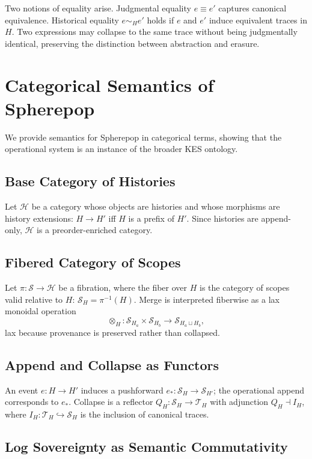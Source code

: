 \documentclass[11pt,a4paper]{article}
\theoremstyle{definition}
\theoremstyle{remark}
\begin{document}
Two notions of equality arise. Judgmental equality $e \equiv e'$ captures canonical equivalence. Historical equality $e \sim_H e'$ holds if $e$ and $e'$ induce equivalent traces in $H$. Two expressions may collapse to the same trace without being judgmentally identical, preserving the distinction between abstraction and erasure.

\section{Categorical Semantics of Spherepop}

We provide semantics for Spherepop in categorical terms, showing that the operational system is an instance of the broader KES ontology.

\subsection{Base Category of Histories}

Let $\mathcal{H}$ be a category whose objects are histories and whose morphisms are history extensions: $H \to H'$ iff $H$ is a prefix of $H'$. Since histories are append-only, $\mathcal{H}$ is a preorder-enriched category.

\subsection{Fibered Category of Scopes}

Let $\pi : \mathcal{S} \to \mathcal{H}$ be a fibration, where the fiber over $H$ is the category of scopes valid relative to $H$: $\mathcal{S}_H = \pi^{-1}(H)$. Merge is interpreted fiberwise as a lax monoidal operation
\[
\otimes_H : \mathcal{S}_{H_a} \times \mathcal{S}_{H_b} \to \mathcal{S}_{H_a \sqcup H_b},
\]
lax because provenance is preserved rather than collapsed.

\subsection{Append and Collapse as Functors}

An event $e : H \to H'$ induces a pushforward $e_* : \mathcal{S}_H \to \mathcal{S}_{H'}$; the operational append corresponds to $e_*$. Collapse is a reflector $Q_H : \mathcal{S}_H \to \mathcal{T}_H$ with adjunction $Q_H \dashv I_H$, where $I_H : \mathcal{T}_H \hookrightarrow \mathcal{S}_H$ is the inclusion of canonical traces.

\subsection{Log Sovereignty as Semantic Commutativity}
\end{document}
